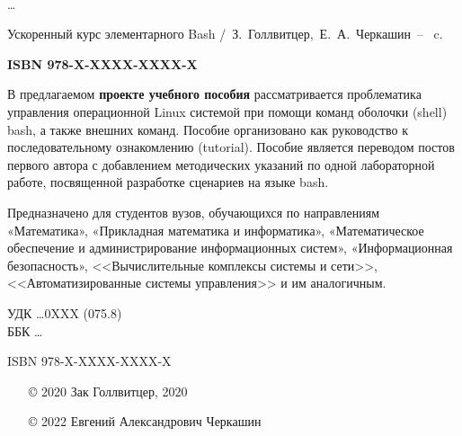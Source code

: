 \documentclass[a4paper,12pt,final,openany]{extbook}
\begin{document}
\vfill
\noindent\begin{minipage}[t]{2em}
\noindent\mbox{}\\
\ldots  %
\end{minipage}%
\begin{minipage}[t]{0.95\linewidth}
\setlength{\parindent}{5ex}


Ускоренный курс элементарного Bash /~З.~Голлвитцер,~Е.~А.~Черкашин~-- \pageref{LastPage}~c.

{\bfseries ISBN 978-X-XXXX-XXXX-X} %

\vspace{2ex}

\begingroup\footnotesize\parskip0pt
\vspace{1ex}

В предлагаемом \textbf{проекте учебного пособия} рассматривается проблематика управления операционной Linux системой при помощи команд оболочки (shell) bash, а также внешних команд. Пособие организовано как руководство к последовательному ознакомлению (tutorial). Пособие является переводом постов первого автора с добавлением методических указаний по одной лабораторной работе, посвященной разработке сценариев на языке bash.

Предназначено для студентов вузов, обучающихся по направлениям «Математика», «Прикладная математика и информатика», «Математическое обеспечение и администрирование информационных систем», «Информационная безопасность», <<Вычислительные комплексы системы и сети>>, <<Автоматизированные системы управления>> и им аналогичным.

\mbox{}
\endgroup
\end{minipage}
\mbox{}\hspace{0.7\linewidth}
\begin{minipage}{0.3\linewidth}\footnotesize\raggedleft
\noindent УДК \ldots 0XXX (075.8) \\ %
\noindent ББК \ldots %
\end{minipage}


\vfill
\noindent\begin{minipage}[t]{0.35\linewidth}\footnotesize
\noindent ISBN 978-X-XXXX-XXXX-X\\
\end{minipage}%
\hspace{6em}
\begin{minipage}[t]{0.65\linewidth}\footnotesize
\begin{itemize}
\setlength{\itemsep}{-0.5ex}
\setlength{\parsep}{0pt}
\item[\copyright{}] 2020 Зак Голлвитцер, 2020
\item[\copyright{}] 2022 Евгений Александрович Черкашин
\end{itemize}
\end{minipage}
\mbox{}
\clearpage
\end{document}
